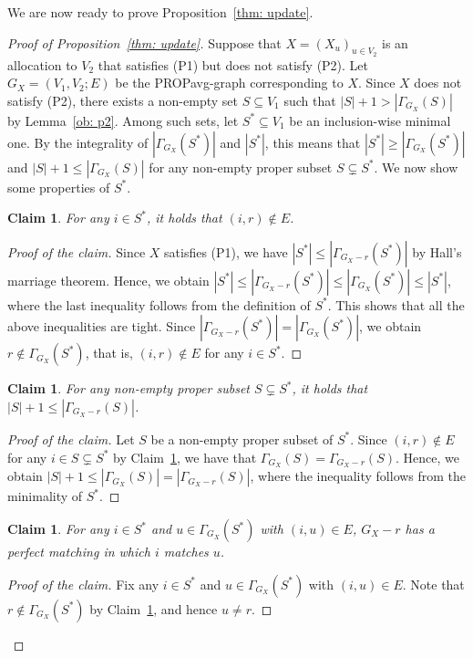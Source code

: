 \documentclass[11pt]{article}
\newtheorem{claim}[theorem]{Claim}
\newcommand{\PROPavg}{\textsf{PROPavg}\xspace}
\begin{document}
We are now ready to prove Proposition~\ref{thm: update}.
\begin{proof}[Proof of Proposition~\ref{thm: update}]
Suppose that $X=(X_u)_{u \in V_2}$ is an allocation to $V_2$ that satisfies (P1) but does not satisfy (P2).
Let $G_X = (V_1, V_2; E)$ be the \PROPavg-graph corresponding to $X$.
Since $X$ does not satisfy (P2), there exists a non-empty set $S \subseteq V_1$ such that $|S|+1 > |\Gamma_{G_X}(S)|$ by Lemma~\ref{ob: p2}. 
Among such sets, let $S^* \subseteq V_1$ be an inclusion-wise minimal one. 
By the integrality of  $|\Gamma_{G_X}(S^*)|$ and $|S^*|$, this means that
$|S^*| \ge |\Gamma_{G_X}(S^*)|$ and $|S|+1 \le |\Gamma_{G_X}(S)|$ for any non-empty proper subset $S \subsetneq S^*$. 
We now show some properties of $S^*$. 

\begin{claim}\label{clm: S*01}
For any $i\in S^*$, it holds that $(i, r) \not\in E$. 
\end{claim}

\begin{proof}[Proof of the claim]
Since $X$ satisfies (P1), we have $|S^*| \le |\Gamma_{G_X-r}(S^*)|$ by Hall's marriage theorem.
Hence, we obtain $|S^*| \le |\Gamma_{G_X-r}(S^*)| \le |\Gamma_{G_X}(S^*)| \le |S^*|$, where the last inequality follows from the definition of $S^*$. 
This shows that all the above inequalities are tight. 
Since $|\Gamma_{G_X-r}(S^*)| = |\Gamma_{G_X}(S^*)|$, we obtain $r \not\in \Gamma_{G_X}(S^*)$, that is,  $(i, r) \not\in E$ for any $i\in S^*$.
\end{proof}

\begin{claim}\label{clm: S*02}
For any non-empty proper subset $S \subsetneq S^*$, it holds that $|S|+1\le |\Gamma_{G_X -r} (S)|$.
\end{claim}

\begin{proof}[Proof of the claim]
Let $S$ be a non-empty proper subset of $S^*$. 
Since $(i, r) \not\in E$ for any $i\in S \subsetneq S^*$ by Claim~\ref{clm: S*01}, 
we have that $\Gamma_{G_X} (S) = \Gamma_{G_X-r} (S)$. 
Hence, we obtain $|S|+1\le |\Gamma_{G_X} (S)| = |\Gamma_{G_X -r} (S)|$, 
where the inequality follows from the minimality of $S^*$.
\end{proof}


\begin{claim}\label{cl: matching}
For any $i\in S^*$ and $u\in \Gamma_{G_X}(S^*)$ with $(i, u)\in E$, $G_X-r$ has a perfect matching in which $i$ matches $u$.
\end{claim}
\begin{proof}[Proof of the claim]
Fix any $i\in S^*$ and $u\in \Gamma_{G_X}(S^*)$ with $(i, u)\in E$.
Note that $r \not\in \Gamma_{G_X}(S^*)$ by Claim~\ref{clm: S*01}, and hence $u \neq r$. 


\end{proof}
\end{proof}
\end{document}
